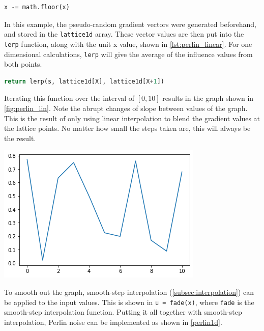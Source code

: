 \documentclass[10pt]{report}
\begin{document}
			\begin{lstlisting}[label={lst:dst}, language=Python, frame=none, caption={Calculating the distance.}, captionpos=b]
				x -= math.floor(x)
			\end{lstlisting}
		
			In this example, the pseudo-random gradient vectors were generated beforehand, and stored in the \lstinline|lattice1d| array. These vector values are then put into the \lstinline|lerp| function, along with the unit x value, shown in \autoref{lst:perlin_linear}. For one dimensional calculations, \lstinline|lerp| will give the average of the influence values from both points. 
			
			\begin{lstlisting}[label={lst:perlin_linear}, language=Python, frame=none, caption={Linear interpolation of influence values}, captionpos=b]
				return lerp(s, lattice1d[X], lattice1d[X+1])
			\end{lstlisting}
		
			Iterating this function over the interval of \([0,10]\) results in the graph shown in \ref{fig:perlin_lin}. Note the abrupt changes of slope between values of the graph. This is the result of only using linear interpolation to blend the gradient values at the lattice points. No matter how small the steps taken are, this will always be the result.
			
			\begin{minipage}{\textwidth}
				\centering
				\includegraphics[scale=.5]{linearinterpo}
				\label{fig:perlin_lin}
			\end{minipage}
		
			To smooth out the graph, smooth-step interpolation (\autoref{subsec:interpolation}) can be applied to the input values. This is shown in \lstinline|u = fade(x)|, where \lstinline|fade| is the smooth-step interpolation function. Putting it all together with smooth-step interpolation, Perlin noise can be implemented as shown in \autoref{perlin1d}.
			
\end{document}
